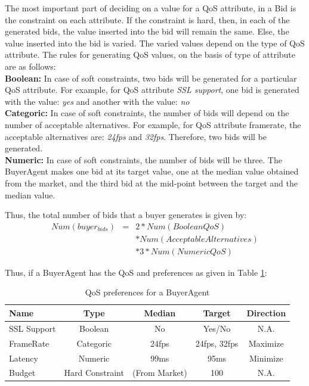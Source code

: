 \documentclass[10pt,journal,compsoc]{IEEEtran}
\begin{document}
The most important part of deciding on a value for a QoS attribute, in a Bid is the constraint on each attribute. If the constraint is hard, then, in each of the generated bids, the value inserted into the bid will remain the same. Else, the value inserted into the bid is varied. The varied values depend on the type of QoS attribute. The rules for generating QoS values, on the basis of type of attribute are as follows:\\
\textbf{Boolean:} In case of soft constraints, two bids will be generated for a particular QoS attribute. For example, for QoS attribute \textit{SSL support}, one bid is generated with the value: \textit{yes} and another with the value: \textit{no}\\
\textbf{Categoric:} In case of soft constraints, the number of bids will depend on the number of acceptable alternatives. For example, for QoS attribute {framerate}, the acceptable alternatives are: \textit{24fps} and \textit{32fps}. Therefore, two bids will be generated. \\
\textbf{Numeric:} In case of soft constraints, the number of bids will be three. The BuyerAgent makes one bid at its target value, one at the median value obtained from the market, and the third bid at the mid-point between the target and the median value.

Thus, the total number of bids that a buyer generates is given by:
\setlength{\arraycolsep}{0.0em}
\begin{eqnarray}
Num(buyer_{bids})&{} = &{ }2 * Num(BooleanQoS)\nonumber\\
						  && *{ }  Num(AcceptableAlternatives)\nonumber\\
						  && *{ } 3 * Num(NumericQoS)
\end{eqnarray}
\setlength{\arraycolsep}{5pt}

Thus, if a BuyerAgent has the QoS and preferences as given in Table \ref{tbl:sample_qos_preferences}:

\begin{table}
\centering
\begin{tabular}{lcccc}
\toprule
\textbf{Name} & \textbf{Type} & \textbf{Median} & \textbf{Target} & \textbf{Direction} \\ 
\midrule
SSL Support & Boolean & No & Yes/No & N.A. \\ 
FrameRate & Categoric & 24fps & 24fps, 32fps & Maximize \\ 
Latency & Numeric & 99ms & 95ms	& Minimize \\ 
Budget & Hard Constraint & (From Market) &  100 & N.A. \\ 
\bottomrule
\end{tabular}
\caption{QoS preferences for a BuyerAgent \label{tbl:sample_qos_preferences}}
\end{table}
\end{document}
